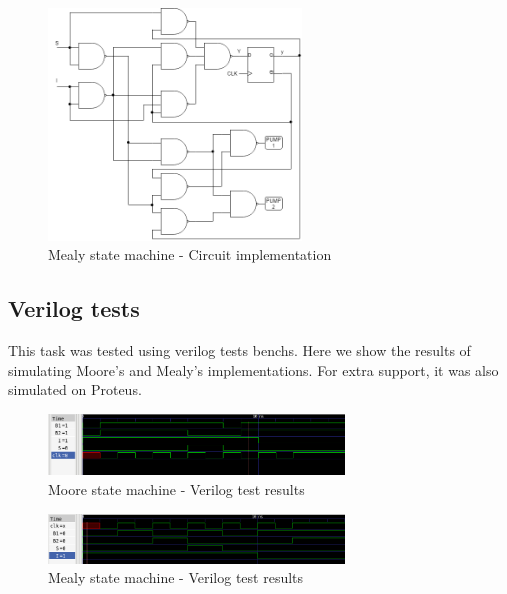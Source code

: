\begin{figure}[H]
    \begin{centering}
    \includegraphics[width=0.6\textwidth]{data/Graficos1/1b_Compuertas_Mealy.png}
    \par\end{centering}
    \caption{Mealy state machine - Circuit implementation}
\end{figure}

\subsection *{Verilog tests}
This task was tested using verilog tests benchs. Here we show the results of simulating Moore's and Mealy's implementations.
For extra support, it was also simulated on Proteus.

\begin{figure}[H]
    \begin{centering}
    \includegraphics[width=0.7\textwidth]{data/Graficos1/ej1b.png}
    \par\end{centering}
    \caption{Moore state machine - Verilog test results}
\end{figure}

\begin{figure}[H]
    \begin{centering}
    \includegraphics[width=0.7\textwidth]{data/Graficos1/ej1a.png}
    \par\end{centering}
    \caption{Mealy state machine - Verilog test results}
\end{figure}

